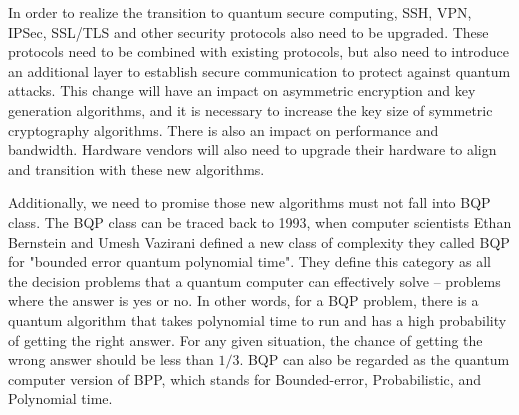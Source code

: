 \documentclass[sigconf]{acmart}
\begin{document}
In order to realize the transition to quantum secure computing, SSH, VPN, IPSec, SSL/TLS and other security protocols also need to be upgraded. These protocols need to be combined with existing protocols, but also need to introduce an additional layer to establish secure communication to protect against quantum attacks. This change will have an impact on asymmetric encryption and key generation algorithms, and it is necessary to increase the key size of symmetric cryptography algorithms. There is also an impact on performance and bandwidth. Hardware vendors will also need to upgrade their hardware to align and transition with these new algorithms.

Additionally, we need to promise those new algorithms must not fall into BQP class. The BQP class can be traced back to 1993, when computer scientists Ethan Bernstein and Umesh Vazirani defined a new class of complexity they called BQP for "bounded error quantum polynomial time"\cite{bernstein_quantum_1997}. They define this category as all the decision problems that a quantum computer can effectively solve -- problems where the answer is yes or no. In other words, for a BQP problem, there is a quantum algorithm that takes polynomial time to run and has a high probability of getting the right answer. For any given situation, the chance of getting the wrong answer should be less than $1/3$. BQP can also be regarded as the quantum computer version of BPP, which stands for Bounded-error, Probabilistic, and Polynomial time\cite{younes_bounded-error_2015}. 
\end{document}
